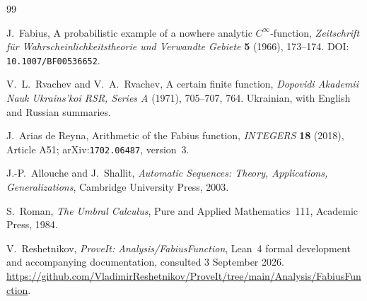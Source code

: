 \documentclass[11pt]{article}
\theoremstyle{definition}
\theoremstyle{remark}
\begin{document}
\begin{thebibliography}{99}

J.~Fabius,
\newblock A probabilistic example of a nowhere analytic
\(C^\infty\)-function,
\newblock \emph{Zeitschrift f\"ur Wahrscheinlichkeitstheorie und Verwandte
Gebiete} \textbf{5} (1966), 173--174.
\newblock DOI: \nolinkurl{10.1007/BF00536652}.

V.~L.~Rvachev and V.~A.~Rvachev,
\newblock A certain finite function,
\newblock \emph{Dopovidi Akademii Nauk Ukrains'koi RSR, Series A}
(1971), 705--707, 764.  Ukrainian, with English and Russian summaries.

J.~Arias de Reyna,
\newblock Arithmetic of the Fabius function,
\newblock \emph{INTEGERS} \textbf{18} (2018), Article A51;
arXiv:\nolinkurl{1702.06487}, version~3.

J.-P.~Allouche and J.~Shallit,
\newblock \emph{Automatic Sequences: Theory, Applications,
Generalizations},
\newblock Cambridge University Press, 2003.

S.~Roman,
\newblock \emph{The Umbral Calculus},
\newblock Pure and Applied Mathematics~111, Academic Press, 1984.

V.~Reshetnikov,
\newblock \emph{ProveIt: Analysis/FabiusFunction},
\newblock Lean~4 formal development and accompanying documentation,
consulted 3 September 2026.
\newblock
\url{https://github.com/VladimirReshetnikov/ProveIt/tree/main/Analysis/FabiusFunction}.

\end{thebibliography}
\end{document}
